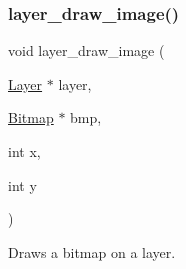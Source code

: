 \subsubsection{\texorpdfstring{layer\+\_\+draw\+\_\+image()}{layer\_draw\_image()}}
{\footnotesize\ttfamily void layer\+\_\+draw\+\_\+image (\begin{DoxyParamCaption}\item[{\mbox{\hyperlink{struct_layer}{Layer}} $\ast$}]{layer,  }\item[{\mbox{\hyperlink{struct_bitmap}{Bitmap}} $\ast$}]{bmp,  }\item[{int}]{x,  }\item[{int}]{y }\end{DoxyParamCaption})}



Draws a bitmap on a layer. 



